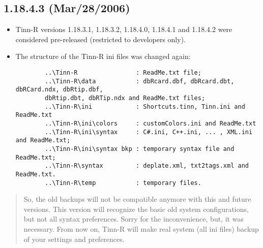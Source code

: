 \subsection{1.18.4.3 (Mar/28/2006)}

\begin{itemize}
  \item Tinn-R versions 1.18.3.1, 1.18.3.2, 1.18.4.0, 1.18.4.1 and 1.18.4.2
    were considered pre-released (restricted to developers only).
  \item The structure of the Tinn-R ini files was changed again:

    \begin{footnotesize}
      \begin{verbatim}
        ..\Tinn-R                : ReadMe.txt file;
        ..\Tinn-R\data           : dbRcard.dbf, dbRcard.dbt, dbRCard.ndx, dbRtip.dbf,
        dbRtip.dbt, dbRTip.ndx and ReadMe.txt files;
        ..\Tinn-R\ini            : Shortcuts.tinn, Tinn.ini and ReadMe.txt
        ..\Tinn-R\ini\colors     : customColors.ini and ReadMe.txt
        ..\Tinn-R\ini\syntax     : C#.ini, C++.ini, ... , XML.ini and ReadMe.txt;
        ..\Tinn-R\ini\syntax bkp : temporary syntax file and ReadMe.txt;
        ..\Tinn-R\syntax         : deplate.xml, txt2tags.xml and ReadMe.txt.
        ..\Tinn-R\temp           : temporary files.
      \end{verbatim}
    \end{footnotesize}

\end{itemize}

\begin{footnotesize}
  \begin{quotation}
    So, the old backups will not be compatible anymore with this and future
    versions. This version will recognize the basic old system configurations,
    but not all syntax preferences. Sorry for the inconvenience, but, it was
    necessary. From now on, Tinn-R will make real system (all ini files)
    backup of your settings and preferences.
  \end{quotation}
\end{footnotesize}

